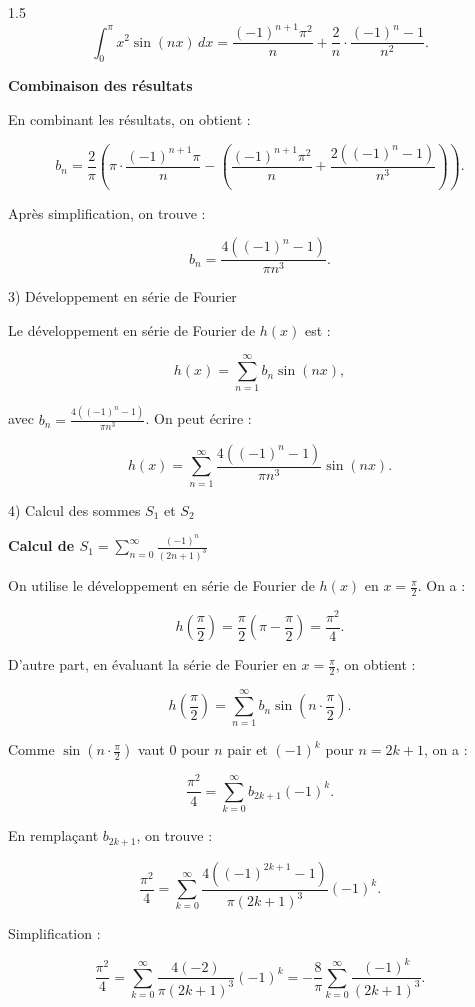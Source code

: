 \documentclass[12pt]{article}
\begin{document}
\begin{spacing}{1.5}
\[
\int_0^\pi x^2 \sin(nx) \, dx = \frac{(-1)^{n+1} \pi^2}{n} + \frac{2}{n} \cdot \frac{(-1)^n - 1}{n^2}.
\]

\textbf{Combinaison des résultats}

En combinant les résultats, on obtient :

\[
b_n = \frac{2}{\pi} \left( \pi \cdot \frac{(-1)^{n+1} \pi}{n} - \left( \frac{(-1)^{n+1} \pi^2}{n} + \frac{2((-1)^n - 1)}{n^3} \right) \right).
\]

Après simplification, on trouve :

\[
b_n = \frac{4((-1)^n - 1)}{\pi n^3}.
\]


3) Développement en série de Fourier

Le développement en série de Fourier de \( h(x) \) est :

\[
h(x) = \sum_{n=1}^\infty b_n \sin(nx),
\]

avec \( b_n = \frac{4((-1)^n - 1)}{\pi n^3} \). On peut écrire :

\[
h(x) = \sum_{n=1}^\infty \frac{4((-1)^n - 1)}{\pi n^3} \sin(nx).
\]

4) Calcul des sommes \( S_1 \) et \( S_2 \)

\textbf{Calcul de \( S_1 = \sum_{n=0}^\infty \frac{(-1)^n}{(2n+1)^3} \)}

On utilise le développement en série de Fourier de \( h(x) \) en \( x = \frac{\pi}{2} \). On a :

\[
h\left(\frac{\pi}{2}\right) = \frac{\pi}{2} \left(\pi - \frac{\pi}{2}\right) = \frac{\pi^2}{4}.
\]

D'autre part, en évaluant la série de Fourier en \( x = \frac{\pi}{2} \), on obtient :

\[
h\left(\frac{\pi}{2}\right) = \sum_{n=1}^\infty b_n \sin\left(n \cdot \frac{\pi}{2}\right).
\]

Comme \( \sin\left(n \cdot \frac{\pi}{2}\right) \) vaut \( 0 \) pour \( n \) pair et \( (-1)^k \) pour \( n = 2k + 1 \), on a :

\[
\frac{\pi^2}{4} = \sum_{k=0}^\infty b_{2k+1} (-1)^k.
\]

En remplaçant \( b_{2k+1} \), on trouve :

\[
\frac{\pi^2}{4} = \sum_{k=0}^\infty \frac{4((-1)^{2k+1} - 1)}{\pi (2k+1)^3} (-1)^k.
\]

Simplification :

\[
\frac{\pi^2}{4} = \sum_{k=0}^\infty \frac{4(-2)}{\pi (2k+1)^3} (-1)^k = -\frac{8}{\pi} \sum_{k=0}^\infty \frac{(-1)^k}{(2k+1)^3}.
\]


\end{spacing}
\end{document}
